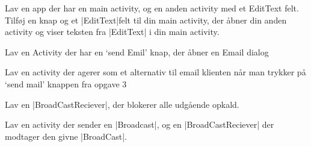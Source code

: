 \begin{exercise}
	Lav en app der har en main activity, og en anden activity med et EditText felt. Tilføj en knap og et \JavaInline|EditText|felt til din main activity, der åbner din anden activity og viser teksten fra \JavaInline|EditText| i din main activity.
\end{exercise}

\begin{exercise}
	Lav en Activity der har en ‘send Emil’ knap, der åbner en Email dialog
\end{exercise}

\begin{exercise}
	Lav en activity der agerer som et alternativ til email klienten når man trykker på ‘send mail’ knappen fra opgave 3
\end{exercise}

\begin{exercise}
	Lav en \JavaInline|BroadCastReciever|, der blokerer alle udgående opkald.
\end{exercise}

\begin{exercise}
	Lav en activity der sender en \JavaInline|Broadcast|, og en \JavaInline|BroadCastReciever| der modtager den givne \JavaInline|BroadCast|.
\end{exercise}

